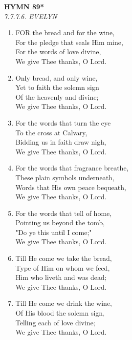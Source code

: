 \documentclass[11pt,a4paper]{article}
\begin{document}
\newpage
\begin{center}
    {\Large \textbf{HYMN 89*\textdagger{}}}
    \\
    \textit{7.7.7.6. EVELYN}
\end{center}
\vspace{1em}

\begin{enumerate}
    \item FOR the bread and for the wine, \\
        For the pledge that seals Him mine, \\
        For the words of love divine, \\
        We give Thee thanks, O Lord.

    \item Only bread, and only wine, \\
        Yet to faith the solemn sign \\
        Of the heavenly and divine; \\
        We give Thee thanks, O Lord.

    \item For the words that turn the eye \\
        To the cross at Calvary, \\
        Bidding us in faith draw nigh, \\
        We give Thee thanks, O Lord.

    \item For the words that fragrance breathe, \\
        These plain symbols underneath, \\
        Words that His own peace bequeath, \\
        We give Thee thanks, O Lord.

    \item For the words that tell of home, \\
        Pointing us beyond the tomb, \\
        "Do ye this until I come;" \\
        We give Thee thanks, O Lord.

    \item Till He come we take the bread, \\
        Type of Him on whom we feed, \\
        Him who liveth and was dead; \\
        We give Thee thanks, O Lord.

    \item Till He come we drink the wine, \\
        Of His blood the solemn sign, \\
        Telling each of love divine; \\
        We give Thee thanks, O Lord.


\end{enumerate}
\end{document}
